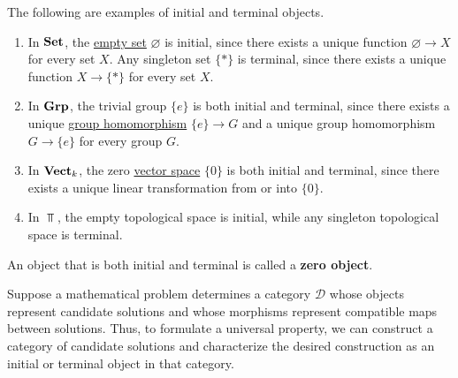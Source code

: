   \begin{example}
    \label{ex:initial-and-terminal-objects}
    The following are examples of initial and terminal objects.
    \begin{enumerate}
      \item In $\operatorname{\mathbf{Set}}$, the \hyperref[st-def:empty-set]{empty set} $\varnothing$ is initial, since there exists a unique function $\varnothing \to X$ for every set $X$. Any singleton set $\{*\}$ is terminal, since there exists a unique function $X \to \{*\}$ for every set $X$.

      \item In $\operatorname{\mathbf{Grp}}$, the trivial group $\{e\}$ is both initial and terminal, since there exists a unique \hyperref[alg-def:group-homomorphism]{group homomorphism} $\{e\} \to G$ and a unique group homomorphism $G \to \{e\}$ for every group $G$.

      \item In $\operatorname{\mathbf{Vect}}_k$, the zero \hyperref[lin-def:vector-space]{vector space} $\{0\}$ is both initial and terminal, since there exists a unique linear transformation from or into $\{0\}$.

      \item In $\Top$, the empty topological space is initial, while any singleton topological space is terminal.
    \end{enumerate}
    An object that is both initial and terminal is called a \textbf{zero object}.
  \end{example}

	Suppose a mathematical problem determines a category $\mathcal D$ whose objects represent candidate solutions and whose morphisms represent compatible maps between solutions. Thus, to formulate a universal property, we can construct a category of candidate solutions and characterize the desired construction as an initial or terminal object in that category.

